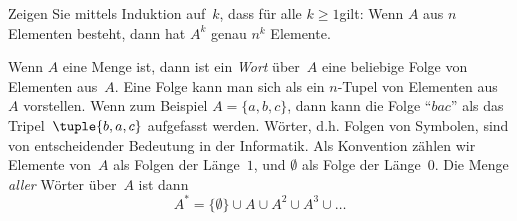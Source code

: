 \documentclass[../../../include/open-logic-section]{subfiles}
\begin{document}
\begin{prob}
Zeigen Sie mittels Induktion auf~$k$, dass für alle $k \ge 1$gilt: Wenn $A$ aus $n$ Elementen besteht,
dann hat $A^k$ genau $n^k$ Elemente.
\end{prob}

\begin{ex}
Wenn $A$ eine Menge ist, dann ist ein \emph{Wort} über~$A$ eine beliebige Folge von Elementen
aus~$A$. Eine Folge kann man sich als ein $n$-Tupel von
Elementen aus~$A$ vorstellen. Wenn zum Beispiel $A = \{a, b, c\}$, dann kann die
Folge ``$bac$'' als das Tripel~$\tuple{b, a, c}$ aufgefasst werden.
Wörter, d.h. Folgen von Symbolen, sind von entscheidender Bedeutung in der
Informatik. Als Konvention zählen wir Elemente von~$A$ als
Folgen der Länge~$1$, und $\emptyset$ als Folge der Länge~$0$.
Die Menge \emph{aller} Wörter über~$A$ ist dann
\[
A^* = \{\emptyset\} \cup A \cup A^2 \cup A^3 \cup \dots
\]
\end{ex}
\end{document}
